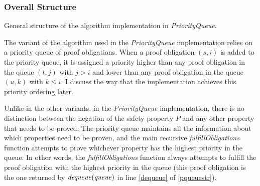 \documentclass[12pt,a4paper,twoside,openright]{report}
\begin{document}
{\subsubsection{Overall Structure}
\begin{algorithm}[!Ht]
\DontPrintSemicolon
{}
\Fn{fulfillObligations$(M,[F_0,\ldots,F_k],{\it queue}])$}{
  \Let{$((s,i), {\it q}) = {\it dequeue(queue)}$ \label{dequeue}}{
  \lIf{$F_{i - 1} \wedge T \Rightarrow \neg s'$}{\Return{${\it pushFrame(M, [F_0, \dots, F_k], q, (s,i))}$}}
  }
  \lElse{\Let{${\it cti = nextCTI(F_{i - 1} \wedge T \Rightarrow \neg s')}$}{
      \If{$I \Rightarrow \neg {\it cti}$}{
        \Let{${\it (fixed, [G_0, \ldots, G_k], d) = propagate([F_0 \cup \{\neg cti\}, F_1, \ldots, F_k], {\it \neg cti})}$}{
          \lIf{\it fixed}{\Return{True}}
          \Return{${\it fulfillObligation(M, [G_0 , \ldots, G_k], (generalize(\neg cti, d),d))}$}
        }
      }
      \lElse{\Return{False}}}}
}
\caption{General structure of the algorithm implementation in {\it PriorityQueue}.}
\label{pqueuestr}
\end{algorithm}

The variant of the algorithm used in the {\it PriorityQueue} implementation
relies on a priority queue of proof obligations.
When a proof obligation $(s,i)$ is added to the priority queue,
it is assigned a priority higher than any proof obligation in the queue $(t,j)$ with $j > i$
and lower than any proof obligation in the queue $(u,k)$ with $k \leq i$. I discuss the
way that the implementation achieves this priority ordering later.

Unlike in the other variants, in the {\it PriorityQueue} implementation, there is
no distinction between the negation of the safety property $P$ and any other property that needs
to be proved. The priority queue maintains all the information about which properties need to be proven,
and the main recursive {\it fulfillObligations} function attempts to prove whichever property has the highest
priority in the queue. In other words, the {\it fulfillObligations} function always 
attempts to fulfill the proof obligation with the highest priority in the queue (this proof obligation
is the one returned by ${\it dequeue(queue)}$ in line \ref{dequeue} of \ref{pqueuestr}).

}
\end{document}

